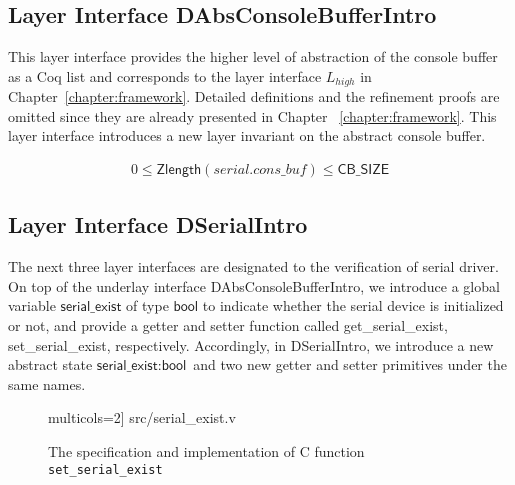 \subsection{Layer Interface DAbsConsoleBufferIntro}

This layer interface provides the higher level of abstraction of the console
buffer as a Coq list and corresponds to the layer interface $L_{high}$ in
Chapter~\ref{chapter:framework}. Detailed definitions and the refinement
proofs are omitted since they are already presented in Chapter~
\ref{chapter:framework}. This layer interface introduces a new layer
invariant on the abstract console buffer.

\begin{invariant}
\begin{align*}
0 \leq \textsf{Zlength} (serial.cons\_buf) \leq \textsf{CB\_SIZE}
\end{align*}
\end{invariant}

\subsection{Layer Interface DSerialIntro}
\label{sec:dserialintro}

The next three layer interfaces are designated to the verification of serial
driver. On top of the underlay interface DAbsConsoleBufferIntro, we introduce a
global variable $\textsf{serial\_exist}$ of type $\textsf{bool}$ to indicate
whether the serial device is initialized or not, and provide a getter and setter
function called \textsf{get\_serial\_exist}, \textsf{set\_serial\_exist},
respectively. Accordingly, in \textsf{DSerialIntro}, we introduce a new abstract
state $\textsf{serial\_exist}: \textsf{bool}$ and two new getter and setter
primitives under the same names.



\begin{figure}
	 multicols=2] {src/serial_exist.v}
	\caption{The specification and implementation of C function \texttt{set\_serial\_exist}}
	\label{fig:serial-exist}
\end{figure}

